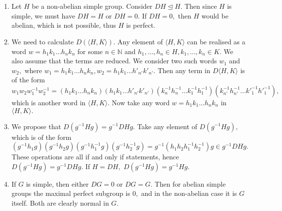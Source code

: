 \documentclass{article}
\title{} %
\author{Gandhar Kulkarni (mmat2304)} %
\date{} %
\begin{document}
\maketitle %


\section{} %
\section{} %
\begin{enumerate}
	\item Let $H$ be a non-abelian simple group. Consider $DH \trianglelefteq H.$ Then since $H$ is simple, we must have $DH= H$ or $DH=0.$ If $DH=0,$ then 
	$H$ would be abelian, which is not possible, thus $H$ is perfect.
	\item We need to calculate $D(\langle H,K\rangle).$ Any element of $\langle H,K \rangle$ can be realised as a word $w=h_1k_1\dots h_nk_n$ for some $n 
	\in \mathbb{N}$ and $h_1,\dots,h_n \in H, k_1,\dots,k_n \in K.$ We also assume that the terms are reduced. We consider two such words $w_1$ and $w_2,$ 
	where $w_1=h_1k_1\dots h_nk_n, w_2=h_1k_1\dots h'_{n'}k'_{n'}.$ Then any term in $D\langle H,K\rangle$ is of the form $w_1w_2w_1^{-1}w_2^{-1}= 
	(h_1k_1\dots h_nk_n)(h_1k_1\dots h'_{n'}k'_{n'})(k^{-1}_nh^{-1}_n\dots k^{-1}_{1}h^{-1}_{1})(k^{-1}_{n'}h^{-1}_{n'}\dots k'^{-1}_{1}h'^{-1}_{1}),$ which 
	is another word in $\langle H,K \rangle.$ Now take any word $w=h_1k_1\dots h_nk_n$ in $\langle H,K \rangle.$ 
	
	\item We propose that $D(g^{-1}Hg)=g^{-1}DHg.$ Take any element of $D(g^{-1}Hg),$ which is of the form 
	$(g^{-1}h_1g)(g^{-1}h_2g)(g^{-1}h_1^{-1}g)(g^{-1}h_2^{-1}g)=g^{-1}(h_1h_2h_1^{-1}h_2^{-1})g \in g^{-1}DHg.$ These operations are all if and only if 
	statements, hence $D(g^{-1}Hg)=g^{-1}DHg.$ If $H=DH,$ $D(g^{-1}Hg)=g^{-1}Hg.$
	\item If $G$ is simple, then either $DG=0$ or $DG=G.$ Then for abelian simple groups the maximal perfect subgroup is $0,$ and in the non-abelian case it 
	is $G$ itself. Both are clearly normal in $G.$ 
\end{enumerate}
\section{} %
\section{} %
\section{} %
\end{document}
